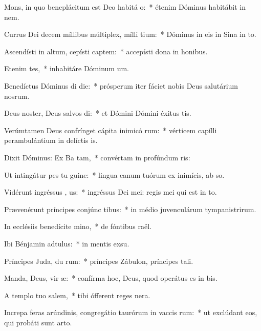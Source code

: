 \item Mons, in quo beneplácitum est Deo habitá  o:~* étenim Dóminus habitábit in nem.
\item Currus Dei decem míllibus múltiplex, mílli tium:~* Dóminus in eis in Sina in to.
\item Ascendísti in altum, cepísti captem:~* accepísti dona in honibus.
\item Etenim  tes,~* inhabitáre Dóminum um.
\item Benedíctus Dóminus di die:~* prósperum iter fáciet nobis Deus salutárium nosrum.
\item Deus noster, Deus salvos di:~* et Dómini Dómini éxitus tis.
\item Verúmtamen Deus confrínget cápita inimicó rum:~* vérticem capílli perambulántium in delíctis is.
\item Dixit Dóminus: Ex Ba tam,~* convértam in profúndum ris:
\item Ut intingátur pes tu  guine:~* lingua canum tuórum ex inimícis, ab so.
\item Vidérunt ingréssus , us:~* ingréssus Dei mei: regis mei qui est in to.
\item Prævenérunt príncipes conjúnc tibus:~* in médio juvenculárum tympanistrirum.
\item In ecclésiis benedícite  mino,~* de fóntibus raël.
\item Ibi Bénjamin adtulus:~* in mentis exsu.
\item Príncipes Juda, du rum:~* príncipes Zábulon, príncipes tali.
\item Manda, Deus, vir æ:~* confírma hoc, Deus, quod operátus es in bis.
\item A templo tuo  salem,~* tibi ófferent reges nera.
\item Increpa feras arúndinis, congregátio taurórum in vaccis rum:~* ut exclúdant eos, qui probáti sunt arto.
